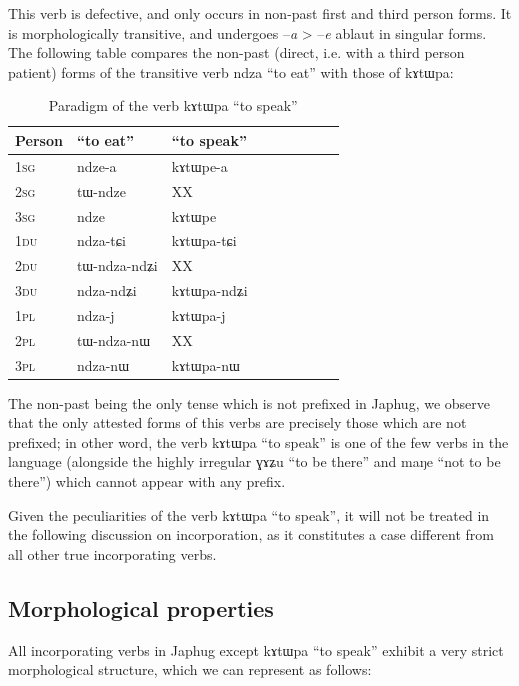 \documentclass[oldfontcommands,oneside,a4paper,11pt]{article}
\newcommand{\ipa}[1]{{\phon #1}} %
\newcommand{\du}{\textsc{du}}
\newcommand{\pl}{\textsc{pl}}
\newcommand{\sg}{\textsc{sg}}
\begin{document}
 
  
  
 This verb is defective, and only occurs in non-past first and third person forms. It is morphologically transitive, and undergoes --\textit{a} > --\textit{e} ablaut in singular forms. The following table compares the non-past (direct, i.e. with a third person patient) forms of the transitive verb \ipa{ndza} ``to eat'' with those of  \ipa{kɤtɯpa}:

\begin{table}[H] \centering
\caption{Paradigm of the verb  \ipa{kɤtɯpa} ``to speak''}\label{tab:katWpa}
\begin{tabular}{lllllllll} \toprule
Person & ``to eat'' & ``to speak'' & \\
\midrule
1\sg{} &  \ipa{ndze-a}& \ipa{kɤtɯpe-a} \\
		2\sg{} &  \ipa{tɯ-ndze}& XX \\
		3\sg{} &  \ipa{ndze}& \ipa{kɤtɯpe} \\
	1\du{} &  \ipa{ndza-tɕi}& \ipa{kɤtɯpa-tɕi} \\
2\du{} &  \ipa{tɯ-ndza-ndʑi}& XX  \\
	3\du{} &  \ipa{ndza-ndʑi}& \ipa{kɤtɯpa-ndʑi} \\
	1\pl{} &  \ipa{ndza-j}& \ipa{kɤtɯpa-j} \\
		2\pl{}&  \ipa{tɯ-ndza-nɯ}& XX  \\
			3\pl{} &  \ipa{ndza-nɯ}& \ipa{kɤtɯpa-nɯ} \\
\bottomrule
\end{tabular}
\end{table}
The non-past being the only tense which is not prefixed in Japhug, we observe that the only attested forms of this verbs are precisely those which are not   prefixed; in other word, the verb \ipa{kɤtɯpa} ``to speak'' is one of the few verbs in the language (alongside the highly irregular \ipa{ɣɤʑu} ``to be there'' and \ipa{maŋe} ``not to be there'') which cannot appear with any prefix.
  
Given the peculiarities of the verb \ipa{kɤtɯpa} ``to speak'', it will not be treated in the following discussion on incorporation, as it constitutes a case different from all other true incorporating verbs.
  

   \subsection{Morphological  properties}
   All incorporating verbs in Japhug  except \ipa{kɤtɯpa} ``to speak'' exhibit a very strict morphological structure, which we can represent as follows:
   
\end{document}
